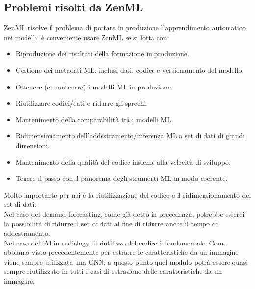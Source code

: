 \documentclass[12pt,a4paper]{report}
\begin{document}
\subsection{Problemi risolti da ZenML}
ZenML risolve il problema di portare in produzione l'apprendimento automatico nei modelli. è conveniente usare ZenML se si lotta con:
\begin{itemize}
    \item Riproduzione dei risultati della formazione in produzione.
    \item Gestione dei metadati ML, inclusi dati, codice e versionamento del modello.
    \item Ottenere (e mantenere) i modelli ML in produzione.
    \item Riutilizzare codici/dati e ridurre gli sprechi.
    \item Mantenimento della comparabilità tra i modelli ML.
    \item Ridimensionamento dell'addestramento/inferenza ML a set di dati di grandi dimensioni.
    \item Mantenimento della qualità del codice insieme alla velocità di sviluppo.
    \item Tenere il passo con il panorama degli strumenti ML in modo coerente.
\end{itemize}

Molto importante per noi è la riutilizzazione del codice e il ridimensionamento del set di dati.\\
Nel caso del demand forecasting, come già detto in precedenza, potrebbe esserci la possibilità di ridurre il set di dati al fine di ridurre anche il tempo di addestramento.\\
Nel caso dell'AI in radiology, il riutilizzo del codice è fondamentale. Come abbiamo visto precedentemente per estrarre le caratteristiche da un immagine viene sempre utilizzata una CNN, a questo punto quel modulo potrà essere quasi sempre riutilizzato in tutti i casi di estrazione delle caratteristiche da un immagine.\\
\end{document}
